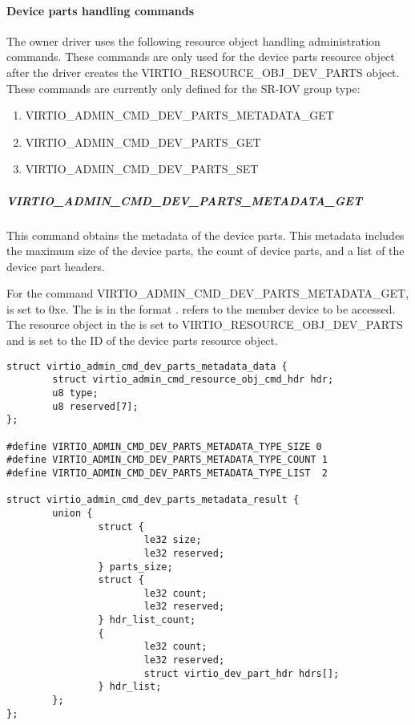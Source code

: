 \paragraph{Device parts handling commands}\label{par:Basic Facilities of a Virtio Device / Device groups / Group administration commands / Device parts / Device parts handling commands}

The owner driver uses the following resource object handling administration
commands. These commands are only used for the device parts resource
object after the driver creates the VIRTIO_RESOURCE_OBJ_DEV_PARTS object.
These commands are currently only defined for the SR-IOV group type:

\begin{enumerate}
\item VIRTIO_ADMIN_CMD_DEV_PARTS_METADATA_GET
\item VIRTIO_ADMIN_CMD_DEV_PARTS_GET
\item VIRTIO_ADMIN_CMD_DEV_PARTS_SET
\end{enumerate}

\subparagraph{VIRTIO_ADMIN_CMD_DEV_PARTS_METADATA_GET}
\label{par:Basic Facilities of a Virtio Device / Device groups / Group administration commands / Device parts / Device parts handling commands / VIRTIO_ADMIN_CMD_DEV_PARTS_METADATA_GET}

This command obtains the metadata of the device parts. This metadata includes
the maximum size of the device parts, the count of device parts, and a list of
the device part headers.

For the command VIRTIO_ADMIN_CMD_DEV_PARTS_METADATA_GET,  is set
to 0xe. The  is in the format
.
 refers to the member device to be accessed.
The resource object  in the  is set to
VIRTIO_RESOURCE_OBJ_DEV_PARTS and  is set to the ID of the
device parts resource object.

\begin{lstlisting}
struct virtio_admin_cmd_dev_parts_metadata_data {
        struct virtio_admin_cmd_resource_obj_cmd_hdr hdr;
        u8 type;
        u8 reserved[7];
};

#define VIRTIO_ADMIN_CMD_DEV_PARTS_METADATA_TYPE_SIZE 0
#define VIRTIO_ADMIN_CMD_DEV_PARTS_METADATA_TYPE_COUNT 1
#define VIRTIO_ADMIN_CMD_DEV_PARTS_METADATA_TYPE_LIST  2

struct virtio_admin_cmd_dev_parts_metadata_result {
        union {
                struct {
                        le32 size;
                        le32 reserved;
                } parts_size;
                struct {
                        le32 count;
                        le32 reserved;
                } hdr_list_count;
                {
                        le32 count;
                        le32 reserved;
                        struct virtio_dev_part_hdr hdrs[];
                } hdr_list;
        };
};
\end{lstlisting}

